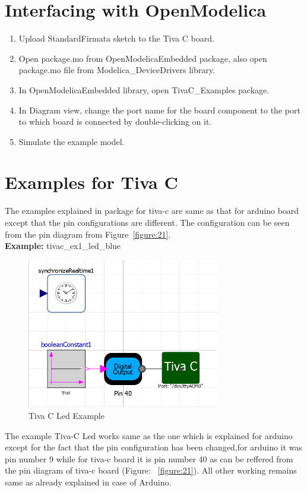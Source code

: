 \documentclass[12pt,a4paper]{report}
\begin{document}
\section{Interfacing with OpenModelica}
\begin{enumerate}
\item Upload StandardFirmata sketch to the Tiva C board.
\item Open package.mo from OpenModelicaEmbedded package, also open package.mo file from Modelica\_DeviceDrivers library.
\item In OpenModelicaEmbedded library, open TivaC\_Examples package.
\item In Diagram view, change the port name for the board component to the port to which board is connected by double-clicking on it.
\item Simulate the example model.
\end{enumerate}

\section{Examples for Tiva C}
The examples explained in package for tiva-c are same as that for arduino board except that the pin configurations are different. The configuration can be seen from the pin diagram from Figure~\ref{figure:21}.\\

\textbf{Example:} tivac\_ex1\_led\_blue
\begin{figure}[H]
\centering
\includegraphics[width =0.75\textwidth]{tiva_led}
\caption{Tiva C Led Example}
\label{figure:22}
\end{figure}
The example Tiva-C Led works same as the one which is explained for arduino except for the fact that the pin configuration has been changed,for arduino it was pin number 9 while for tiva-c board it is pin number 40 as can be reffered from the pin diagram of tiva-c board (Figure: ~\ref{figure:21}). All other working remains same as already explained in case of Arduino.\\
\end{document}
